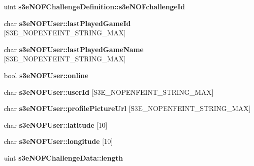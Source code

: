 \begin{DoxyCompactItemize}
\item 
\hypertarget{group___n_open_feint_api_group_ga9dd95cd7517008538410a677ab14bd53}{
uint {\bfseries s3eNOFChallengeDefinition::s3eNOFchallengeId}}
\label{group___n_open_feint_api_group_ga9dd95cd7517008538410a677ab14bd53}

\item 
\hypertarget{group___n_open_feint_api_group_ga006e0fc3783b27c0dcc38b15c238f857}{
char {\bfseries s3eNOFUser::lastPlayedGameId} \mbox{[}S3E\_\-NOPENFEINT\_\-STRING\_\-MAX\mbox{]}}
\label{group___n_open_feint_api_group_ga006e0fc3783b27c0dcc38b15c238f857}

\item 
\hypertarget{group___n_open_feint_api_group_gaa2660e7649786483081b1c907a767591}{
char {\bfseries s3eNOFUser::lastPlayedGameName} \mbox{[}S3E\_\-NOPENFEINT\_\-STRING\_\-MAX\mbox{]}}
\label{group___n_open_feint_api_group_gaa2660e7649786483081b1c907a767591}

\item 
\hypertarget{group___n_open_feint_api_group_gaf2b2516a60a29534aa94fc9f901a629b}{
bool {\bfseries s3eNOFUser::online}}
\label{group___n_open_feint_api_group_gaf2b2516a60a29534aa94fc9f901a629b}

\item 
\hypertarget{group___n_open_feint_api_group_gafd32f1539eaa5e98839c34cef6e40c4a}{
char {\bfseries s3eNOFUser::userId} \mbox{[}S3E\_\-NOPENFEINT\_\-STRING\_\-MAX\mbox{]}}
\label{group___n_open_feint_api_group_gafd32f1539eaa5e98839c34cef6e40c4a}

\item 
\hypertarget{group___n_open_feint_api_group_gac94b3e2f5b51e04bc998cb0e7fc18fe0}{
char {\bfseries s3eNOFUser::profilePictureUrl} \mbox{[}S3E\_\-NOPENFEINT\_\-STRING\_\-MAX\mbox{]}}
\label{group___n_open_feint_api_group_gac94b3e2f5b51e04bc998cb0e7fc18fe0}

\item 
\hypertarget{group___n_open_feint_api_group_ga1cb952b9a174f212cdd38915a12c4560}{
char {\bfseries s3eNOFUser::latitude} \mbox{[}10\mbox{]}}
\label{group___n_open_feint_api_group_ga1cb952b9a174f212cdd38915a12c4560}

\item 
\hypertarget{group___n_open_feint_api_group_gac30e43a59dd4cd87a9c48b2a456367c8}{
char {\bfseries s3eNOFUser::longitude} \mbox{[}10\mbox{]}}
\label{group___n_open_feint_api_group_gac30e43a59dd4cd87a9c48b2a456367c8}

\item 
\hypertarget{group___n_open_feint_api_group_ga0a8617b1651e0991d5145ac746fadc8a}{
uint {\bfseries s3eNOFChallengeData::length}}
\label{group___n_open_feint_api_group_ga0a8617b1651e0991d5145ac746fadc8a}


\end{DoxyCompactItemize}
